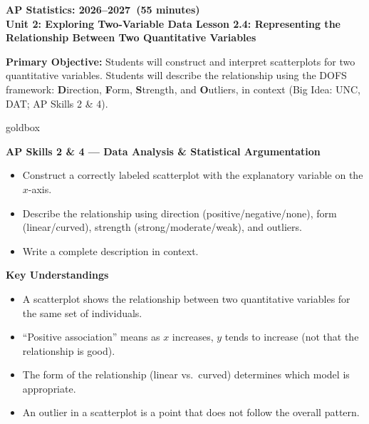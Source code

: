 \documentclass[10pt]{article}
\newcommand{\CourseName}{AP Statistics}
\newcommand{\SchoolYear}{2026--2027}
\newcommand{\MeetingLength}{55 minutes}
\newcommand{\UnitNumberName}{Unit 2: Exploring Two-Variable Data \quad}
\newcommand{\LessonNumberName}{Lesson 2.4: Representing the Relationship Between Two Quantitative Variables}
\begin{document}
\begin{center}
    {\Large\bfseries \CourseName: \SchoolYear\ (\MeetingLength) \\
    {\small\bfseries \UnitNumberName \LessonNumberName}}
\end{center}

\begin{tcolorbox}[colback=sky,colframe=navy,boxrule=0.9pt,arc=2mm,
    left=2mm,right=2mm,top=1.5mm,bottom=1.5mm]
    \textbf{Primary Objective:} Students will construct and interpret scatterplots for two
    quantitative variables. Students will describe the relationship using the DOFS framework:
    \textbf{D}irection, \textbf{F}orm, \textbf{S}trength, and \textbf{O}utliers, in context
    (Big Idea: UNC, DAT; AP Skills 2 \& 4).
\end{tcolorbox}

\begin{skillbox}{goldbox}
\begin{minipage}[t]{0.48\linewidth}
    \textbf{AP Skills 2 \& 4 --- Data Analysis \& Statistical Argumentation}
    \begin{itemize}
        \item Construct a correctly labeled scatterplot with the explanatory variable on the $x$-axis.
        \item Describe the relationship using direction (positive/negative/none), form (linear/curved), strength (strong/moderate/weak), and outliers.
        \item Write a complete description in context.
    \end{itemize}
\end{minipage}
\hfill
\begin{minipage}[t]{0.48\linewidth}
    \textbf{Key Understandings}
    \begin{itemize}
        \item A scatterplot shows the relationship between two quantitative variables for the same set of individuals.
        \item ``Positive association'' means as $x$ increases, $y$ tends to increase (not that the relationship is good).
        \item The form of the relationship (linear vs.\ curved) determines which model is appropriate.
        \item An outlier in a scatterplot is a point that does not follow the overall pattern.
    \end{itemize}
\end{minipage}
\end{skillbox}
\end{document}
